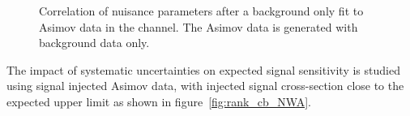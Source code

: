 \begin{figure}[!ht]
\begin{center}
\caption{Correlation of nuisance parameters after a background only fit to Asimov data in the \llll channel.
The Asimov data is generated with background data only.
}
\label{fig:NPcorr_cb_asimov}
\end{center}
\end{figure}

The impact of systematic uncertainties on expected signal sensitivity is studied using signal injected Asimov data, with injected signal cross-section close to the expected upper limit as shown in figure~\ref{fig:rank_cb_NWA}.

